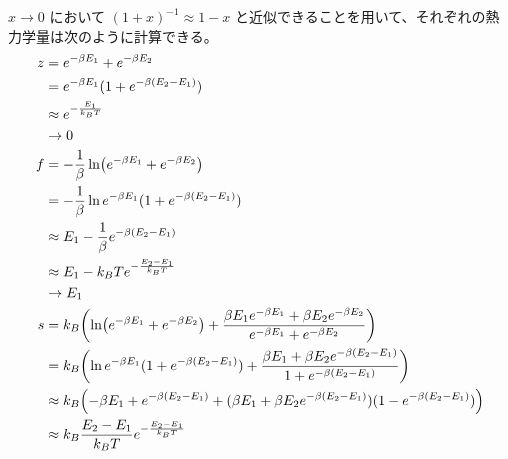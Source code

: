 \documentclass[uplatex,dvipdfmx,a4paper,11pt]{jlreq}
\theoremstyle{definition}
\begin{document}
$x \to 0$ において $(1 + x)^{-1} \approx 1 - x$ と近似できることを用いて、それぞれの熱力学量は次のように計算できる。
\begin{align}
  z & = e^{-\beta E_1} + e^{-\beta E_2}                                                                                                           \\
    & = e^{-\beta E_1}(1 + e^{-\beta (E_2 - E_1)})                                                                                                \\
    & \approx e^{-\frac{E_1}{k_BT}}                                                                                                               \\
    & \to 0                                                                                                                                       \\
  f & = -\frac{1}{\beta}\ln (e^{-\beta E_1} + e^{-\beta E_2})                                                                                     \\
    & = -\frac{1}{\beta}\ln e^{-\beta E_1}(1 + e^{-\beta (E_2 - E_1)})                                                                            \\
    & \approx E_1 - \frac{1}{\beta}e^{-\beta (E_2 - E_1)}                                                                                         \\
    & \approx E_1 - k_BTe^{-\frac{E_2 - E_1}{k_BT}}                                                                                               \\
    & \to E_1                                                                                                                                     \\
  s & = k_B\qty(\ln(e^{-\beta E_1} + e^{-\beta E_2}) + \frac{\beta E_1e^{-\beta E_1} + \beta E_2e^{-\beta E_2}}{e^{-\beta E_1} + e^{-\beta E_2}}) \\
    & = k_B\qty(\ln e^{-\beta E_1}(1 + e^{-\beta (E_2 - E_1)}) + \frac{\beta E_1 + \beta E_2e^{-\beta (E_2 - E_1)}}{1 + e^{-\beta (E_2 - E_1)}})  \\
    & \approx k_B\qty(-\beta E_1 + e^{-\beta (E_2 - E_1)} + (\beta E_1 + \beta E_2e^{-\beta (E_2 - E_1)})(1 - e^{-\beta (E_2 - E_1)}))            \\
    & \approx k_B \frac{E_2 - E_1}{k_BT}e^{- \frac{E_2 - E_1}{k_BT}}                                                                              \\

\end{align}
\end{document}
